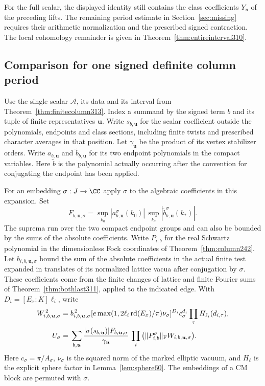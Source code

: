 \documentclass[a4paper,11pt]{article}
\theoremstyle{definition}
\theoremstyle{remark}
\numberwithin{equation}{section}
\begin{document}
For the full scalar, the displayed identity still contains
the class coefficients \(Y_u\) of the preceding lifts.
The remaining period estimate in Section~\ref{sec:missing}
requires their arithmetic normalization and the prescribed
signed contraction. The local cohomology remainder is given
in Theorem~\ref{thm:entireinterval310}.

\subsection{Comparison for one signed definite column period}\label{nav:I-77}
Use the single scalar \(\mathcal A\), its data and its interval
from Theorem~\ref{thm:finitecolumn313}. Index a summand by the
signed term \(b\) and its tuple of finite representatives
\(\boldsymbol u\). Write \(s_{b,\boldsymbol u}\) for the scalar
coefficient outside the polynomials, endpoints and class sections,
including finite twists and prescribed character averages in that
position. Let \(\gamma_{\boldsymbol u}\) be the product of its
vertex stabilizer orders. Write \(a_{b,\boldsymbol u}\) and
\(\widetilde b_{b,\boldsymbol u}\) for its two endpoint
polynomials in the compact variables. Here \(\widetilde b\) is
the polynomial actually occurring after the convention for
conjugating the endpoint has been applied.

For an embedding \(\sigma:J\to\CC\) apply \(\sigma\) to the
algebraic coefficients in this expansion. Set
\[
 F_{b,\boldsymbol u,\sigma}
 =\sup_{k_0} |a_{b,\boldsymbol u}^{\sigma}(k_0)|\,
       \sup_{k_*}|\widetilde b_{b,\boldsymbol u}^{\sigma}(k_*)|.
\]
The suprema run over the two compact endpoint groups and can also
be bounded by the sums of the absolute coefficients. Write
\(P_{i,b}\) for the real Schwartz polynomial in the dimensionless
Fock coordinates of Theorem~\ref{thm:column242}.
Let \(b_{i,b,\boldsymbol u,\sigma}\) bound the sum of the absolute
coefficients in the actual finite test expanded in translates of
its normalized lattice vacua after conjugation by \(\sigma\).
These coefficients come from the finite changes of lattice and
finite Fourier sums of Theorem~\ref{thm:bothlast311}, applied to
the indicated edge. With \(D_i=[E_x:K]\ell_i\), write
\[
 \begin{split}
 W_{i,b,\boldsymbol u,\sigma}^{\,2}
  ={}& b_{i,b,\boldsymbol u,\sigma}^{\,2}
   [e\max(1,2\ell_i\operatorname{rd}(E_x)/\pi)\nu_\sigma]^{D_i}
          c_\sigma^{d_i}\prod_\tau H_{\ell_i}(d_{i,\tau}),\\
 U_\sigma={}&\sum_{b,\boldsymbol u}
   \frac{|\sigma(s_{b,\boldsymbol u})|F_{b,\boldsymbol u,\sigma}}
        {\gamma_{\boldsymbol u}}\,
   \prod_i \big(\|P_{i,b}^{\sigma}\|_{\rm F}
                         W_{i,b,\boldsymbol u,\sigma}\big).
 \end{split}
\]
Here \(c_\sigma=\pi/A_\sigma\), \(\nu_\sigma\) is the squared norm
of the marked elliptic vacuum, and \(H_\ell\) is the explicit
sphere factor in Lemma~\ref{lem:sphere60}. The embeddings of a CM
block are permuted with \(\sigma\).
\end{document}

